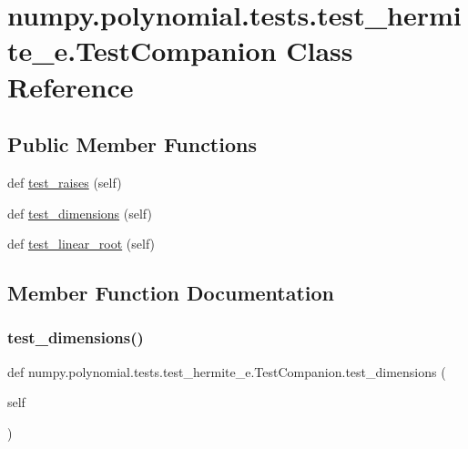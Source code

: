 \hypertarget{classnumpy_1_1polynomial_1_1tests_1_1test__hermite__e_1_1TestCompanion}{}\section{numpy.\+polynomial.\+tests.\+test\+\_\+hermite\+\_\+e.\+Test\+Companion Class Reference}
\label{classnumpy_1_1polynomial_1_1tests_1_1test__hermite__e_1_1TestCompanion}
\subsection*{Public Member Functions}
\begin{DoxyCompactItemize}
\item 
def \hyperlink{classnumpy_1_1polynomial_1_1tests_1_1test__hermite__e_1_1TestCompanion_a0358fb7e71e385d0c0bc953ecd939a13}{test\+\_\+raises} (self)
\item 
def \hyperlink{classnumpy_1_1polynomial_1_1tests_1_1test__hermite__e_1_1TestCompanion_a557ecef19b824b6deaa34c079f524e65}{test\+\_\+dimensions} (self)
\item 
def \hyperlink{classnumpy_1_1polynomial_1_1tests_1_1test__hermite__e_1_1TestCompanion_a242fc11c2e9b906cb8b4b580f6322d9d}{test\+\_\+linear\+\_\+root} (self)
\end{DoxyCompactItemize}


\subsection{Member Function Documentation}
\mbox{\label{classnumpy_1_1polynomial_1_1tests_1_1test__hermite__e_1_1TestCompanion_a557ecef19b824b6deaa34c079f524e65}} 
\subsubsection{\texorpdfstring{test\+\_\+dimensions()}{test\_dimensions()}}
{\footnotesize\ttfamily def numpy.\+polynomial.\+tests.\+test\+\_\+hermite\+\_\+e.\+Test\+Companion.\+test\+\_\+dimensions (\begin{DoxyParamCaption}\item[{}]{self }\end{DoxyParamCaption})}

